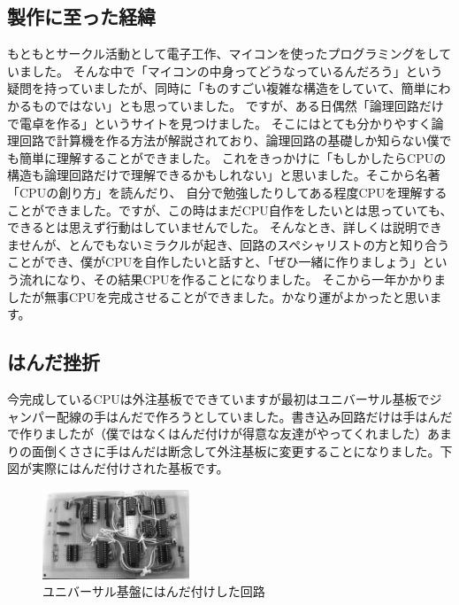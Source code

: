 \documentclass[11pt,b5paper,papersize,dvipdfmx]{jsbook}
\begin{document}
\subsection{製作に至った経緯}
もともとサークル活動として電子工作、マイコンを使ったプログラミングをしていました。
そんな中で「マイコンの中身ってどうなっているんだろう」という疑問を持っていましたが、同時に「ものすごい複雑な構造をしていて、簡単にわかるものではない」とも思っていました。
ですが、ある日偶然「論理回路だけで電卓を作る」というサイトを見つけました。
そこにはとても分かりやすく論理回路で計算機を作る方法が解説されており、論理回路の基礎しか知らない僕でも簡単に理解することができました。
これをきっかけに「もしかしたらCPUの構造も論理回路だけで理解できるかもしれない」と思いました。そこから名著「CPUの創り方」を読んだり、
自分で勉強したりしてある程度CPUを理解することができました。ですが、この時はまだCPU自作をしたいとは思っていても、できるとは思えず行動はしていませんでした。
そんなとき、詳しくは説明できませんが、とんでもないミラクルが起き、回路のスペシャリストの方と知り合うことができ、僕がCPUを自作したいと話すと、「ぜひ一緒に作りましょう」という流れになり、その結果CPUを作ることになりました。
そこから一年かかりましたが無事CPUを完成させることができました。かなり運がよかったと思います。

%
\subsection{はんだ挫折}
今完成しているCPUは外注基板でできていますが最初はユニバーサル基板でジャンパー配線の手はんだで作ろうとしていました。書き込み回路だけは手はんだで作りましたが（僕ではなくはんだ付けが得意な友達がやってくれました）あまりの面倒くささに手はんだは断念して外注基板に変更することになりました。下図が実際にはんだ付けされた基板です。

\begin{figure}[H]
    \centering
    \includegraphics[width=4.4cm]{honda/img/monokuro_kairo.png}
    \caption{ユニバーサル基盤にはんだ付けした回路}
    \label{fig:kairo-of-handa}
\end{figure}

%
\end{document}
